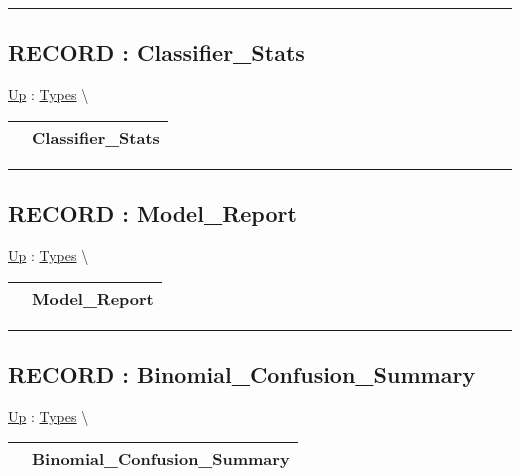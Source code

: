 \par


\rule{\linewidth}{0.5pt}
\subsection*{RECORD : Classifier\_Stats}
\hypertarget{ecldoc:logisticregression.types.classifier_stats}{}
\hyperlink{ecldoc:LogisticRegression.Types}{Up} :
\hspace{0pt} \hyperlink{ecldoc:LogisticRegression.Types}{Types} \textbackslash 

{\renewcommand{\arraystretch}{1.5}
\begin{tabularx}{\textwidth}{|>{\raggedright\arraybackslash}l|X|}
\hline
\hspace{0pt} & Classifier\_Stats \\
\hline
\end{tabularx}
}

\par


\rule{\linewidth}{0.5pt}
\subsection*{RECORD : Model\_Report}
\hypertarget{ecldoc:logisticregression.types.model_report}{}
\hyperlink{ecldoc:LogisticRegression.Types}{Up} :
\hspace{0pt} \hyperlink{ecldoc:LogisticRegression.Types}{Types} \textbackslash 

{\renewcommand{\arraystretch}{1.5}
\begin{tabularx}{\textwidth}{|>{\raggedright\arraybackslash}l|X|}
\hline
\hspace{0pt} & Model\_Report \\
\hline
\end{tabularx}
}

\par


\rule{\linewidth}{0.5pt}
\subsection*{RECORD : Binomial\_Confusion\_Summary}
\hypertarget{ecldoc:logisticregression.types.binomial_confusion_summary}{}
\hyperlink{ecldoc:LogisticRegression.Types}{Up} :
\hspace{0pt} \hyperlink{ecldoc:LogisticRegression.Types}{Types} \textbackslash 

{\renewcommand{\arraystretch}{1.5}
\begin{tabularx}{\textwidth}{|>{\raggedright\arraybackslash}l|X|}
\hline
\hspace{0pt} & Binomial\_Confusion\_Summary \\
\hline
\end{tabularx}
}

